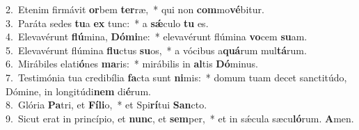{2.~}Etenim firmávit \textbf{or}bem \textbf{ter}ræ,~* qui non \textbf{com}mo\textbf{vé}bitur.\\
{3.~}Paráta sedes \textbf{tu}a \textbf{ex} tunc:~* a \textbf{sǽ}culo \textbf{tu} es.\\
{4.~}Elevavérunt \textbf{flú}mina, \textbf{Dó}\textbf{mi}ne:~* elevavérunt flúmina \textbf{vo}cem \textbf{su}am.\\
{5.~}Elevavérunt flúmina \textbf{flu}ctus \textbf{su}os,~* a vócibus a\textbf{quá}rum mul\textbf{tá}rum.\\
{6.~}Mirábiles elati\textbf{ó}nes \textbf{ma}ris:~* mirábilis in \textbf{al}tis \textbf{Dó}minus.\\
{7.~}Testimónia tua credibília \textbf{fa}cta sunt \textbf{ni}mis:~* domum tuam decet sanctitúdo, Dómine, in longitúdi\textbf{nem} di\textbf{é}rum.\\
{8.~}Glória \textbf{Pa}tri, et \textbf{Fí}\textbf{li}o,~* et Spi\textbf{rí}tui \textbf{San}cto.\\
{9.~}Sicut erat in princípio, et \textbf{nunc}, et \textbf{sem}per,~* et in sǽcula sæcu\textbf{ló}rum. \textbf{A}men.\\

